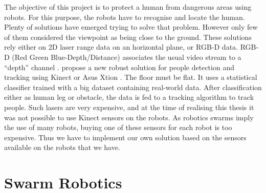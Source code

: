 \documentclass[oneside, a4paper, 12pt]{memoir}
\begin{document}
		The objective of this project is to protect a human from dangerous areas using robots. For this purpose, the robots have to recognise and locate the human. Plenty of solutions have emerged trying to solve that problem. However only few of them considered the viewpoint as being close to the ground. These solutions rely either on 2D laser range data on an horizontal plane, or RGB-D data. RGB-D (Red Green Blue-Depth/Distance) associates the usual video stream to a \enquote{depth} channel \citep{wiki:004}. \citet{gritti2014kinect} propose a new robust solution for people detection and tracking using Kinect \citep{kinect} or Asus Xtion \citep{asus}. The floor must be flat. It uses a statistical classifier trained with a big dataset containing real-world data. After classification either as human leg or obstacle, the data is fed to a tracking algorithm to track people. Such lasers are very expensive, and at the time of realising this thesis it was not possible to use Kinect sensors on the robots. As robotics swarms imply the use of many robots, buying one of these sensors for each robot is too expensive. Thus we have to implement our own solution based on the sensors available on the robots that we have.
		
	\section{Swarm Robotics}

	
\end{document}
